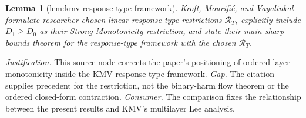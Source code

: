 \documentclass{article}
\newtheorem{lemma}{Lemma}
\begin{document}
\begin{lemma}[lem:kmv-response-type-framework]\label{lem:kmv-response-type-framework}
Kroft, Mourifi\'e, and Vayalinkal formulate researcher-chosen linear response-type restrictions \(\mathcal R_T\), explicitly include \(D_1\ge D_0\) as their Strong Monotonicity restriction, and state their main sharp-bounds theorem for the response-type framework with the chosen \(\mathcal R_T\).
\end{lemma}
\par\smallskip\noindent \textit{Justification.} This source node corrects the paper's positioning of ordered-layer monotonicity inside the KMV response-type framework. \textit{Gap.} The citation supplies precedent for the restriction, not the binary-harm flow theorem or the ordered closed-form contraction. \textit{Consumer.} The comparison fixes the relationship between the present results and KMV's multilayer Lee analysis.
\end{document}

